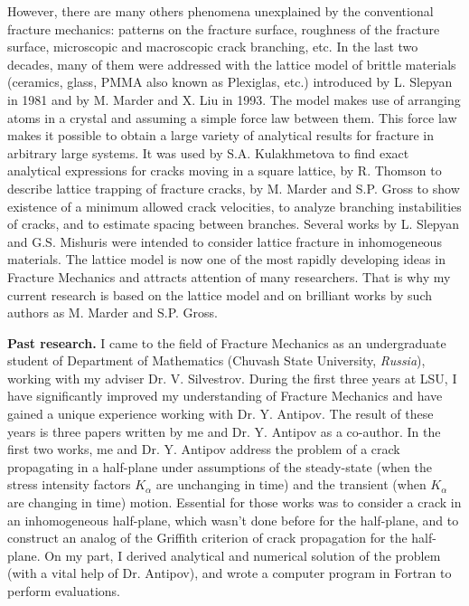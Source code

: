 \documentclass[11pt]{amsart}
\begin{document}
However, there are many others phenomena unexplained by the conventional fracture mechanics: patterns on the fracture surface, roughness of the fracture surface, microscopic and macroscopic crack branching, etc. In the last two decades, many of them were addressed with the lattice model of brittle materials (ceramics, glass, PMMA also known as Plexiglas, etc.) introduced by L. Slepyan in 1981 and by M. Marder and X. Liu in 1993. The model makes use of arranging atoms in a crystal and assuming a simple force law between them. This force law makes it possible to obtain a large variety of analytical results for fracture in arbitrary large systems. It was used by S.A. Kulakhmetova to find exact analytical expressions for cracks moving in a square lattice, by R. Thomson to describe lattice trapping of fracture cracks, by M. Marder and S.P. Gross to show existence of a minimum allowed crack velocities, to analyze branching instabilities of cracks, and to estimate spacing between branches. Several works by L. Slepyan and G.S. Mishuris were intended to consider lattice fracture in inhomogeneous materials. The lattice model is now one of the most rapidly developing ideas in Fracture Mechanics and attracts attention of many researchers. That is why my current research is based on the lattice model and on brilliant works by such authors as M. Marder and S.P. Gross.

\bigskip

\textbf{Past research.} I came to the field of Fracture Mechanics as an undergraduate student of Department of Mathematics (Chuvash State University, \emph{Russia}), working with my adviser Dr. V. Silvestrov. During the first three years at LSU, I have significantly improved my understanding of Fracture Mechanics and have gained a unique experience working with Dr. Y. Antipov. The result of these years is three papers written by me and Dr. Y. Antipov as a co-author. In the first two works, me and Dr. Y. Antipov address the problem of a crack propagating in a half-plane under assumptions of the steady-state (when the stress intensity factors $K_\alpha$ are unchanging in time) and the transient (when $K_\alpha$ are changing in time) motion. Essential for those works was to consider a crack in an inhomogeneous half-plane, which wasn't done before for the half-plane, and to construct an analog of the Griffith criterion of crack propagation for the half-plane. On my part, I derived analytical and numerical solution of the problem (with a vital help of Dr. Antipov), and wrote a computer program in Fortran to perform evaluations.
\end{document}
